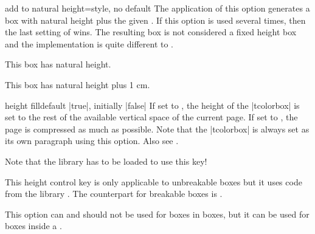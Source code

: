 \begin{docTcbKey}[][doc new=2016-02-16]{add to natural height}{=}{style, no default}
  The application of this option generates a box with natural height plus
  the given . If this option is used several times, then the
  last setting of  wins. The resulting box is not considered
  a fixed height box and the implementation is quite different to
  .
\begin{dispExample}

\begin{tcolorbox}
  This box has natural height.
\end{tcolorbox}
\begin{tcolorbox}[add to natural height=1cm]
  This box has natural height plus 1 cm.
\end{tcolorbox}
\end{dispExample}
\end{docTcbKey}


\clearpage
\begin{docTcbKey}[][doc new and updated={2014-09-22}{2016-02-17}]{height fill}{}{default |true|, initially |false|}
If set to , the height of the |tcolorbox| is set to the rest of the
available vertical space of the current page.
If set to , the page is compressed as much as possible.
Note that the |tcolorbox|
is always set as its own paragraph using this option.
Also see .
\begin{marker}
Note that the library  has to be loaded to use this key!
\end{marker}
This height control key is only applicable to unbreakable boxes but it
uses code from the library .
The counterpart for breakable boxes is .

This option can and should not be used for boxes in boxes, but it can be
used for boxes inside a .

\begin{dispListing}
\begin{tcolorbox}[height fill,
  colback=red!5!white,colframe=red!75!black,fonttitle=\bfseries,
  title=Box which fills the rest of the page]
\lipsum[1]
\end{tcolorbox}
\end{dispListing}
\end{docTcbKey}
{\tcbusetemp}


